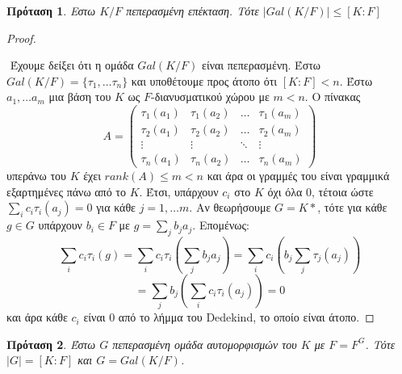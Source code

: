 \documentclass[oneside,a4paper]{article}
\newtheorem{prop}{Πρόταση}
\newcommand {\tl}{\textlatin}
\begin{document}
\vspace{0.1cm}
\begin{prop}
	Εστω $K/F$ πεπερασμένη επέκταση. Τότε $|Gal(K/F)| \leq [K:F]$
\end{prop}

\begin{proof} $ $

	$ $\newline
	Έχουμε δείξει ότι η ομάδα $Gal(K/F)$ είναι πεπερασμένη. Έστω $Gal(K/F) = \{\tau_1 , \ldots \tau_n \}$ και υποθέτουμε προς άτοπο ότι $[K:F] < n$. Έστω $a_1 ,\ldots a_m$ μια βάση του $K$ ως $F$-διανυσματικού χώρου με $m<n$. Ο πίνακας
	\[A = 
	\begin{pmatrix}
		\tau_1 (a_1) & \tau_1 (a_2) & \ldots  & \tau_1 (a_m) \\
		\tau_2 (a_1) & \tau_2 (a_2) & \ldots & \tau_2 (a_m) \\
		\vdots & \vdots & \ddots & \vdots \\
		\tau_n (a_1) & \tau_n (a_2) & \ldots & \tau_n (a_m)
	\end{pmatrix}
	\]
	υπεράνω του $K$ έχει $rank(A) \leq m < n$ και άρα οι γραμμές του είναι γραμμικά εξαρτημένες πάνω από το $K$. Έτσι, υπάρχουν $c_i$ στο $K$ όχι όλα $0$, τέτοια ώστε $\sum\limits_i c_i \tau_i (a_j) = 0$ για κάθε $j = 1,\ldots m$. Αν θεωρήσουμε $G = K*$, τότε για κάθε $g \in G$ υπάρχουν $b_i \in F$ με $g = \sum\limits_j b_j a_j$.
	Επομένως:
	$$\sum\limits_i c_i \tau_i (g) = \sum\limits_i c_i \tau_i \left(\sum\limits_j b_j a_j\right) = \sum\limits_i c_i \left( b_j \sum\limits_j \tau_j (a_j)\right)$$
	$$ = \sum\limits_j b_j \left( \sum\limits_i c_i \tau_i (a_j) \right) = 0$$
	και άρα κάθε $c_i$ είναι $0$ από το λήμμα του \tl{Dedekind}, το οποίο είναι άτοπο.
\end{proof}
\vspace{0.1cm}
\begin{prop}
	\label{duo dekatessera}
	Έστω $G$ πεπερασμένη ομάδα αυτομορφισμών του $K$ με $F=F^G$. Τότε $|G| = [K:F]$ και $G = Gal(K/F)$.
\end{prop}
\end{document}
